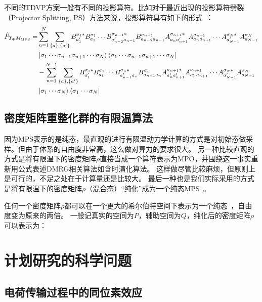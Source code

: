 \documentclass{article}
\begin{document}
不同的TDVP方案一般有不同的投影算符。比如对于最近出现的投影算符劈裂（Projector Splitting, PS）方法来说，投影算符具有如下的形式~\cite{Haeg16}：
\begin{equation}
\begin{aligned}
    \hat P_{T_{\Psi}M_{\text{MPS}}} = & \sum_{n=1}^N \sum_{\{a\},\{a'\}}
     B^{\sigma_1*}_{a'_1} B^{\sigma_1}_{a_1} \cdots B^{\sigma_{n-1}*}_{a'_{n-2}a_{n-1}} B^{\sigma_{n-1}}_{a_{n-2}a_{n-1}}
     A^{\sigma_{n+1}*}_{a_n a'_{n+1}} A^{\sigma_{n+1}}_{a_n a_{n+1}} \cdots A^{\sigma_N*}_{a'_{N-1}} A^{\sigma_N}_{a_{N-1}} \\
    &  \ket{ \sigma_1\cdots\sigma_{n-1}\sigma_{n+1}\cdots\sigma_N }
       \bra{ \sigma_1\cdots\sigma_{n-1}\sigma_{n+1}\cdots\sigma_N } \\
    & - \sum_{n=1}^{N-1} \sum_{\{a\},\{a'\}}
     B^{\sigma_1*}_{a'_1} B^{\sigma_1}_{a_1} \cdots B^{\sigma_{n}*}_{a'_{n-1}a_{n}} B^{\sigma_{n}}_{a_{n-1}a_{n}}
     A^{\sigma_{n+1}*}_{a'_n a'_{n+1}} A^{\sigma_{n+1}}_{a'_n a_{n+1}} \cdots A^{\sigma_N*}_{a'_{N-1}} A^{\sigma_N}_{a_{N-1}} \\
    &  \ket{ \sigma_1\cdots\sigma_N } \bra{ \sigma_1\cdots\sigma_N }
\end{aligned}
\end{equation}

\subsection{密度矩阵重整化群的有限温算法}

因为MPS表示的是纯态，最直观的进行有限温动力学计算的方式是对初始态做采样。但由于体系的自由度非常高，这么做对算力的要求很大。
另一种比较直观的方式是将有限温下的密度矩阵$\rho$直接当成一个算符表示为MPO，并围绕这一事实重新用公式表述DMRG相关算法如含时演化算法。
这样做尽管比较麻烦，但原则上是可行的，不足之处在于计算量还是比较大。
最后一种也是我们实际采用的方式是将有限温下的密度矩阵$\rho$（混合态）“纯化”成为一个纯态MPS~\cite{White05ft}。

任何一个密度矩阵$\rho$都可以在一个更大的希尔伯特空间下表示为一个纯态~\cite{nielsen00}，自由度变为原来的两倍。
一般记真实的空间为$P$，辅助空间为$Q$，纯化后的密度矩阵$\rho$可以表示为：


\section{计划研究的科学问题}
\subsection{电荷传输过程中的同位素效应}
\end{document}

